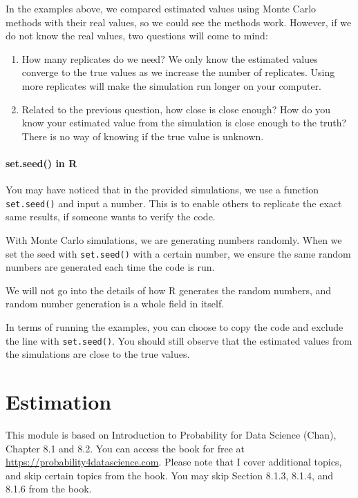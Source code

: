 \documentclass[
]{book}
\begin{document}
In the examples above, we compared estimated values using Monte Carlo methods with their real values, so we could see the methods work. However, if we do not know the real values, two questions will come to mind:

\begin{enumerate}
\def\labelenumi{\arabic{enumi}.}
\item
  How many replicates do we need? We only know the estimated values converge to the true values as we increase the number of replicates. Using more replicates will make the simulation run longer on your computer.
\item
  Related to the previous question, how close is close enough? How do you know your estimated value from the simulation is close enough to the truth? There is no way of knowing if the true value is unknown.
\end{enumerate}

\subsubsection{set.seed() in R}\label{set.seed-in-r}

You may have noticed that in the provided simulations, we use a function \texttt{set.seed()} and input a number. This is to enable others to replicate the exact same results, if someone wants to verify the code.

With Monte Carlo simulations, we are generating numbers randomly. When we set the seed with \texttt{set.seed()} with a certain number, we ensure the same random numbers are generated each time the code is run.

We will not go into the details of how R generates the random numbers, and random number generation is a whole field in itself.

In terms of running the examples, you can choose to copy the code and exclude the line with \texttt{set.seed()}. You should still observe that the estimated values from the simulations are close to the true values.

\chapter{Estimation}\label{est}

This module is based on Introduction to Probability for Data Science (Chan), Chapter 8.1 and 8.2. You can access the book for free at \url{https://probability4datascience.com}. Please note that I cover additional topics, and skip certain topics from the book. You may skip Section 8.1.3, 8.1.4, and 8.1.6 from the book.
\end{document}

